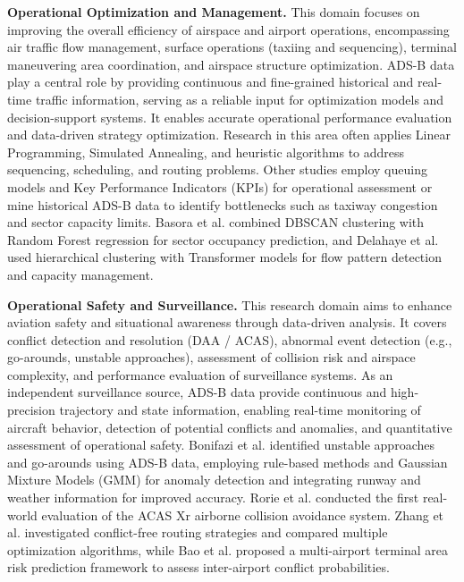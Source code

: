 \textbf{Operational Optimization and Management.} 
This domain focuses on improving the overall efficiency of airspace and airport operations, encompassing air traffic flow management, surface operations (taxiing and sequencing), terminal maneuvering area coordination, and airspace structure optimization. ADS-B data play a central role by providing continuous and fine-grained historical and real-time traffic information, serving as a reliable input for optimization models and decision-support systems. It enables accurate operational performance evaluation and data-driven strategy optimization. Research in this area often applies Linear Programming, Simulated Annealing, and heuristic algorithms to address sequencing, scheduling, and routing problems. Other studies employ queuing models and Key Performance Indicators (KPIs) for operational assessment or mine historical ADS-B data to identify bottlenecks such as taxiway congestion and sector capacity limits. Basora et al. \cite{basora2018occupancy} combined DBSCAN clustering with Random Forest regression for sector occupancy prediction, and Delahaye et al. \cite{delahaye2022air} used hierarchical clustering with Transformer models for flow pattern detection and capacity management.

\textbf{Operational Safety and Surveillance.} 
This research domain aims to enhance aviation safety and situational awareness through data-driven analysis. It covers conflict detection and resolution (DAA / ACAS), abnormal event detection (e.g., go-arounds, unstable approaches), assessment of collision risk and airspace complexity, and performance evaluation of surveillance systems. As an independent surveillance source, ADS-B data provide continuous and high-precision trajectory and state information, enabling real-time monitoring of aircraft behavior, detection of potential conflicts and anomalies, and quantitative assessment of operational safety.
Bonifazi et al. \cite{bonifazi2021modeling} identified unstable approaches and go-arounds using ADS-B data, employing rule-based methods and Gaussian Mixture Models (GMM) for anomaly detection and integrating runway and weather information for improved accuracy. Rorie et al. \cite{rorie2024detect} conducted the first real-world evaluation of the ACAS Xr airborne collision avoidance system. Zhang et al. \cite{zhang2024study} investigated conflict-free routing strategies and compared multiple optimization algorithms, while Bao et al. \cite{bao2024exploring} proposed a multi-airport terminal area risk prediction framework to assess inter-airport conflict probabilities. 

